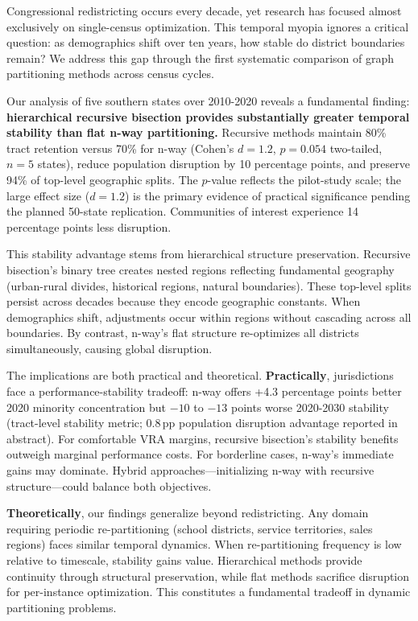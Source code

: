 Congressional redistricting occurs every decade, yet research has focused almost exclusively on single-census optimization. This temporal myopia ignores a critical question: as demographics shift over ten years, how stable do district boundaries remain? We address this gap through the first systematic comparison of graph partitioning methods across census cycles.

Our analysis of five southern states over 2010-2020 reveals a fundamental finding: \textbf{hierarchical recursive bisection provides substantially greater temporal stability than flat n-way partitioning.} Recursive methods maintain 80\% tract retention versus 70\% for n-way (Cohen's $d=1.2$, $p=0.054$ two-tailed, $n=5$ states), reduce population disruption by 10 percentage points, and preserve 94\% of top-level geographic splits.
The $p$-value reflects the pilot-study scale; the large effect size ($d=1.2$) is the primary evidence of practical significance pending the planned 50-state replication. Communities of interest experience 14 percentage points less disruption.

This stability advantage stems from hierarchical structure preservation. Recursive bisection's binary tree creates nested regions reflecting fundamental geography (urban-rural divides, historical regions, natural boundaries). These top-level splits persist across decades because they encode geographic constants. When demographics shift, adjustments occur within regions without cascading across all boundaries. By contrast, n-way's flat structure re-optimizes all districts simultaneously, causing global disruption.

The implications are both practical and theoretical. \textbf{Practically}, jurisdictions face a performance-stability tradeoff: n-way offers +4.3 percentage points better 2020 minority concentration but $-10$ to $-13$ points worse 2020-2030 stability (tract-level stability metric; 0.8\,pp population disruption advantage reported in abstract). For comfortable VRA margins, recursive bisection's stability benefits outweigh marginal performance costs. For borderline cases, n-way's immediate gains may dominate. Hybrid approaches—initializing n-way with recursive structure—could balance both objectives.

\textbf{Theoretically}, our findings generalize beyond redistricting. Any domain requiring periodic re-partitioning (school districts, service territories, sales regions) faces similar temporal dynamics. When re-partitioning frequency is low relative to timescale, stability gains value. Hierarchical methods provide continuity through structural preservation, while flat methods sacrifice disruption for per-instance optimization. This constitutes a fundamental tradeoff in dynamic partitioning problems.

